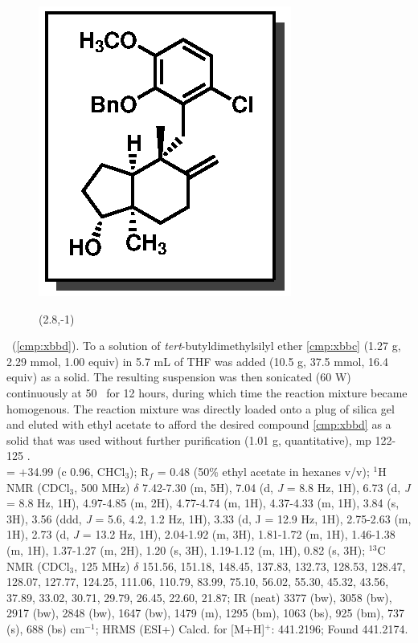 \vspace{10pt}
\begin{figure}
  \vspace{-25pt}
  \begin{center}
    \includegraphics[scale=0.8]{chp_singlecarbon/images/xbbd}
    \begin{textblock}{1}(2.8,-1)  \end{textblock}
  \end{center}
  \vspace{-30pt}
\end{figure}\noindent \textbf{\CMPxbbd}\ (\ref{cmp:xbbd}). To a solution of
\textit{tert}-butyldimethylsilyl ether \ref{cmp:xbbc} (1.27 g, 2.29 mmol, 1.00 equiv) in 5.7 mL of
THF was added  (10.5 g, 37.5 mmol, 16.4 equiv) as a solid.
The resulting suspension was then sonicated (60 W) continuously at 50 \degc\ 
for 12 hours, during which time the reaction mixture became homogenous.
The reaction mixture was directly loaded onto a plug of silica gel and eluted with ethyl acetate to
afford the desired compound \ref{cmp:xbbd} as a solid that was used without further purification
(1.01 g, quantitative), mp 122-125 \degc. \\
\rotation = $+$34.99 (c 0.96, CHCl$_3$); R$_f$ = 0.48 (50\% ethyl acetate in hexanes v/v); $^1$H NMR (CDCl$_3$, 500
MHz) $\delta$ 7.42-7.30 (m, 5H), 7.04 (d, \textit{J} = 8.8 Hz, 1H), 6.73 (d, \textit{J} = 8.8 Hz, 1H), 4.97-4.85 (m, 2H),
4.77-4.74 (m, 1H), 4.37-4.33 (m, 1H), 3.84 (s, 3H), 3.56 (ddd, \textit{J} = 5.6, 4.2, 1.2 Hz, 1H), 3.33 (d, J
= 12.9 Hz, 1H), 2.75-2.63 (m, 1H), 2.73 (d, \textit{J} = 13.2 Hz, 1H), 2.04-1.92 (m, 3H), 1.81-1.72 (m,
1H), 1.46-1.38 (m, 1H), 1.37-1.27 (m, 2H), 1.20 (s, 3H), 1.19-1.12 (m, 1H), 0.82 (s, 3H); $^{13}$C
NMR (CDCl$_3$, 125 MHz) $\delta$ 151.56, 151.18, 148.45, 137.83, 132.73, 128.53, 128.47, 128.07,
127.77, 124.25, 111.06, 110.79, 83.99, 75.10, 56.02, 55.30, 45.32, 43.56, 37.89, 33.02, 30.71,
29.79, 26.45, 22.60, 21.87; IR (neat) 3377 (bw), 3058 (bw), 2917 (bw), 2848 (bw), 1647 (bw),
1479 (m), 1295 (bm), 1063 (bs), 925 (bm), 737 (s), 688 (bs) cm$^{-1}$; HRMS (ESI+) Calcd. for
\ce{C27H34ClO3} [M+H]$^+$: 441.2196; Found 441.2174.

